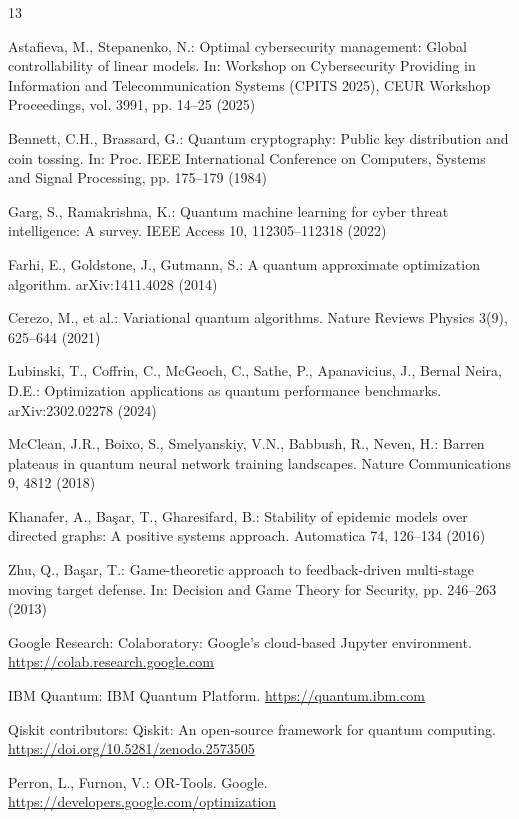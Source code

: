 \documentclass[runningheads]{llncs}
\begin{document}
\begin{thebibliography}{13}

Astafieva, M., Stepanenko, N.: Optimal cybersecurity management: Global controllability of linear models. In: Workshop on Cybersecurity Providing in Information and Telecommunication Systems (CPITS 2025), CEUR Workshop Proceedings, vol. 3991, pp. 14--25 (2025)

Bennett, C.H., Brassard, G.: Quantum cryptography: Public key distribution and coin tossing. In: Proc. IEEE International Conference on Computers, Systems and Signal Processing, pp. 175--179 (1984)

Garg, S., Ramakrishna, K.: Quantum machine learning for cyber threat intelligence: A survey. IEEE Access 10, 112305--112318 (2022)

Farhi, E., Goldstone, J., Gutmann, S.: A quantum approximate optimization algorithm. arXiv:1411.4028 (2014)

Cerezo, M., et al.: Variational quantum algorithms. Nature Reviews Physics 3(9), 625--644 (2021)

Lubinski, T., Coffrin, C., McGeoch, C., Sathe, P., Apanavicius, J., Bernal Neira, D.E.: Optimization applications as quantum performance benchmarks. arXiv:2302.02278 (2024)

McClean, J.R., Boixo, S., Smelyanskiy, V.N., Babbush, R., Neven, H.: Barren plateaus in quantum neural network training landscapes. Nature Communications 9, 4812 (2018)

Khanafer, A., Başar, T., Gharesifard, B.: Stability of epidemic models over directed graphs: A positive systems approach. Automatica 74, 126--134 (2016)

Zhu, Q., Başar, T.: Game-theoretic approach to feedback-driven multi-stage moving target defense. In: Decision and Game Theory for Security, pp. 246--263 (2013)

Google Research: Colaboratory: Google's cloud-based Jupyter environment. \url{https://colab.research.google.com}

IBM Quantum: IBM Quantum Platform. \url{https://quantum.ibm.com}

Qiskit contributors: Qiskit: An open-source framework for quantum computing. \url{https://doi.org/10.5281/zenodo.2573505}

Perron, L., Furnon, V.: OR-Tools. Google. \url{https://developers.google.com/optimization}

\end{thebibliography}
\end{document}
